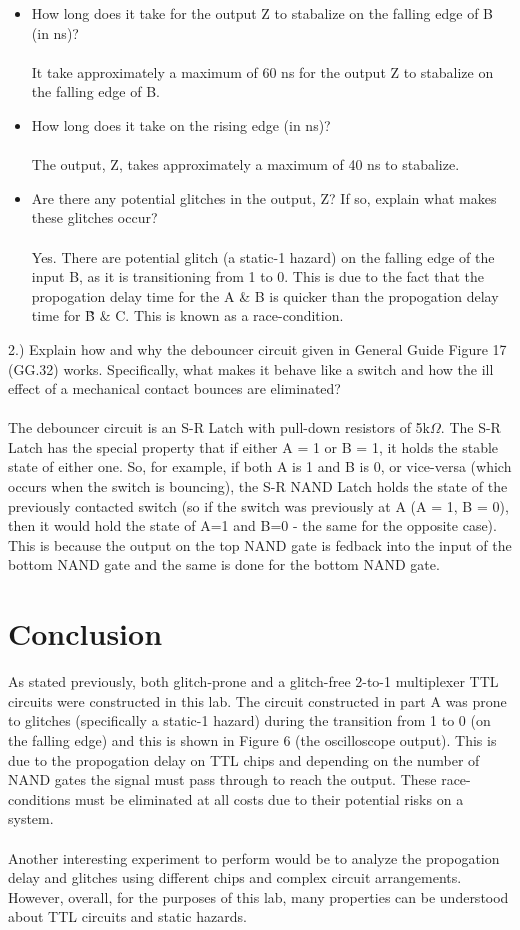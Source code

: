 \documentclass{scrartcl}
\begin{document}
\begin{itemize}
	\item How long does it take for the output Z to stabalize on the falling edge of B (in ns)? \\ \\
			It take approximately a maximum of 60 ns for the output Z to stabalize on the falling edge of B.
	\item  How long does it take on the rising edge (in ns)? \\ \\
			The output, Z, takes approximately a maximum of 40 ns to stabalize.
	\item Are there any potential glitches in the output, Z? If so, explain what makes these glitches occur? \\ \\
			Yes. There are potential glitch (a static-1 hazard) on the falling edge of the input B, as it is transitioning from 1 to 0. This is due to the fact that the propogation delay time for the A \& B is quicker than the propogation delay time for \~B \& C. This is known as a race-condition.
\end{itemize}
2.) Explain how and why the debouncer circuit given in General Guide Figure 17 (GG.32) works. Specifically, what makes it behave like a switch and how the ill effect of a mechanical contact bounces are eliminated? \\ \\
	The debouncer circuit is an S-R Latch with pull-down resistors of 5k$\Omega$. The S-R Latch has the special property that if either A = 1 or B = 1, it holds the stable state of either one. So, for example, if both A is 1 and B is 0, or vice-versa (which occurs when the switch is bouncing), the S-R NAND Latch holds the state of the previously contacted switch (so if the switch was previously at A (A = 1, B = 0), then it would hold the state of A=1 and B=0 - the same for the opposite case). This is because the output on the top NAND gate is fedback into the input of the bottom NAND gate and the same is done for the bottom NAND gate. 	
\section{Conclusion}
As stated previously, both glitch-prone and a glitch-free 2-to-1 multiplexer TTL circuits were constructed in this lab. The circuit constructed in part A was prone to glitches (specifically a static-1 hazard) during the transition from 1 to 0 (on the falling edge) and this is shown in Figure 6 (the oscilloscope output). This is due to the propogation delay on TTL chips and depending on the number of NAND gates the signal must pass through to reach the output. These race-conditions must be eliminated at all costs due to their potential risks on a system. \\ \\ Another interesting experiment to perform would be to analyze the propogation delay and glitches using different chips and complex circuit arrangements. However, overall, for the purposes of this lab, many properties can be understood about TTL circuits and static hazards.
\end{document}
